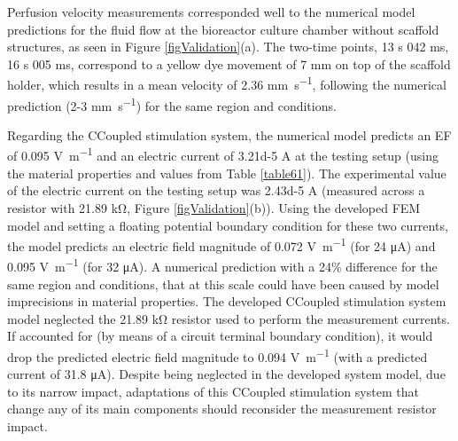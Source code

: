 Perfusion velocity measurements corresponded well to the numerical model predictions for the fluid flow at the bioreactor culture chamber without scaffold structures, as seen in Figure \ref{figValidation}(a). The two-time points, 13 \si{\second} 042 \si{\milli\second}, 16 \si{\second} 005 \si{\milli\second}, correspond to a yellow dye movement of 7 \si{\milli\meter} on top of the scaffold holder, which results in a mean velocity of 2.36 \si{\milli\meter\per\second}, following the numerical prediction (2-3 \si{\milli\meter\per\second}) for the same region and conditions. 

Regarding the \acs{CCoupled} stimulation system, the numerical model predicts an \acs{EF} of \num{0.095} \si{\volt\per\meter} and an electric current of \num{3.21d-5} \si{\ampere} at the testing setup (using the material properties and values from Table \ref{table61}). The experimental value of the electric current on the testing setup was \num{2.43d-5} \si{\ampere} (measured across a resistor with \num{21.89} \si{\kilo\ohm}, Figure \ref{figValidation}(b)). Using the developed \acs{FEM} model and setting a floating potential boundary condition for these two currents, the model predicts an electric field magnitude of 0.072 \si{\volt\per\meter} (for 24 \si{\micro\ampere}) and 0.095 \si{\volt\per\meter} (for 32 \si{\micro\ampere}). A numerical prediction with a 24\% difference for the same region and conditions, that at this scale could have been caused by model imprecisions in material properties. The developed \acs{CCoupled} stimulation system model neglected the \num{21.89} \si{\kilo\ohm} resistor used to perform the measurement currents. If accounted for (by means of a circuit terminal boundary condition), it would drop the predicted electric field magnitude to 0.094 \si{\volt\per\meter} (with a predicted current of \num{31.8} \si{\micro\ampere}). Despite being neglected in the developed system model, due to its narrow impact, adaptations of this \acs{CCoupled} stimulation system that change any of its main components should reconsider the measurement resistor impact.    


